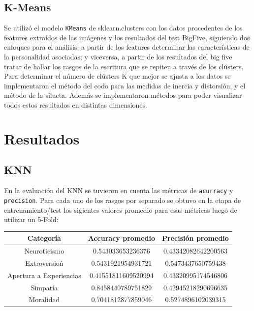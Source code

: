 \documentclass[10pt, a4paper]{article}
\begin{document}
       \subsection{K-Means}
			Se utiliz\'o el modelo \texttt{KMeans} de sklearn.clusters con los datos procedentes de los features extra\'idos de las im\'agenes y los resultados del test BigFive, siguiendo dos enfoques para el an\'alisis: a partir de los features determinar las caracter\'isticas de la personalidad asociadas; y viceversa, a partir de los resultados del big five tratar de hallar los rasgos de la escritura que se repiten a trav\'es de los cl\'usters. Para determinar el n\'umero de cl\'usters K que mejor se ajusta a los datos se implementaron el m\'etodo del codo para las medidas de inercia y distorsi\'on, y el m\'etodo de la silueta. Adem\'as se implementaron m\'etodos para poder visualizar todos estos resultados en distintas dimensiones. 
			
    \section{Resultados}
            \subsection{KNN}
                En la evaluaci\'on del KNN se tuvieron en cuenta las m\'etricas de \texttt{acurracy} y \texttt{precision}. Para cada uno de los rasgos por separado se
                obtuvo en la etapa de entrenamiento/test los sigientes valores promedio para esas m\'etricas luego de utilizar un 5-Fold: \\

                \begin{tabular}[H]{|c|c|c|}

                    \hline Categor\'ia & Accuracy promedio & Precisi\'on promedio \\  
                    \hline Neuroticismo & 0.543033653236376 & 0.43342082642200563 \\
                    \hline Extroversio\'n& 0.5431921954931721 & 0.5473437650759438 \\
                    \hline Apertura a Experiencias & 0.41551811609520994 & 0.43320995174546806 \\
                    \hline Simpat\'ia& 0.8458440789751829 & 0.42945218290696635 \\
                    \hline Moralidad & 0.7041812877859046 & 0.5274896102039315 \\
                    \hline
                \end{tabular}
\end{document}
